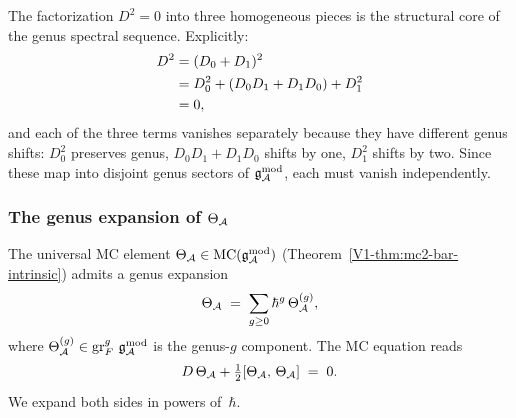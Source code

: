 \begin{remark}
The factorization $D^2 = 0$ into three homogeneous pieces is the
structural core of the genus spectral sequence. Explicitly:
\begin{align}
D^2 &= (D_0 + D_1)^2 \notag\\
&= D_0^2 + (D_0 D_1 + D_1 D_0) + D_1^2 \notag\\
&= 0,%
\end{align}
and each of the three terms vanishes separately because they
have different genus shifts: $D_0^2$ preserves genus,
$D_0 D_1 + D_1 D_0$ shifts by one, $D_1^2$ shifts by two.
Since these map into disjoint genus sectors of $\mathfrak{g}_{\mathcal{A}}^{\mathrm{mod}}$,
each must vanish independently.
\end{remark}

\subsubsection{The genus expansion of $\Theta_{\mathcal{A}}$}

The universal MC element $\Theta_{\mathcal{A}} \in \text{MC}(\mathfrak{g}_{\mathcal{A}}^{\mathrm{mod}})$
(Theorem~\ref*{V1-thm:mc2-bar-intrinsic}) admits a genus expansion
\begin{equation}%
\Theta_\cA
\;=\;
\sum_{g \geq 0} \hbar^g\,\Theta^{(g)}_\cA,
\end{equation}
where $\Theta^{(g)}_{\mathcal{A}} \in \operatorname{gr}^g_F\,\mathfrak{g}_{\mathcal{A}}^{\mathrm{mod}}$ is the genus-$g$
component. The MC equation reads
\begin{equation}%
D\,\Theta_\cA
+ \tfrac{1}{2}[\Theta_\cA,\, \Theta_\cA]
\;=\; 0.
\end{equation}
We expand both sides in powers of~$\hbar$.

